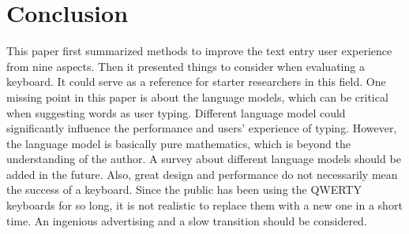 \documentclass[11pt]{article}
\begin{document}
\section{Conclusion}\label{section-improvement}
This paper first summarized methods to improve the text entry user experience from nine aspects. Then it presented things to consider when evaluating a keyboard. It could serve as a reference for starter researchers in this field. One missing point in this paper is about the language models, which can be critical when suggesting words as user typing. Different language model could significantly influence the performance and users' experience of typing. However, the language model is basically pure mathematics, which is beyond the understanding of the author. A survey about different language models should be added in the future. Also, great design and performance do not necessarily mean the success of a keyboard. Since the public has been using the QWERTY keyboards for so long, it is not realistic to replace them with a new one in a short time. An ingenious advertising and a slow transition should be considered.\\



\end{document}
